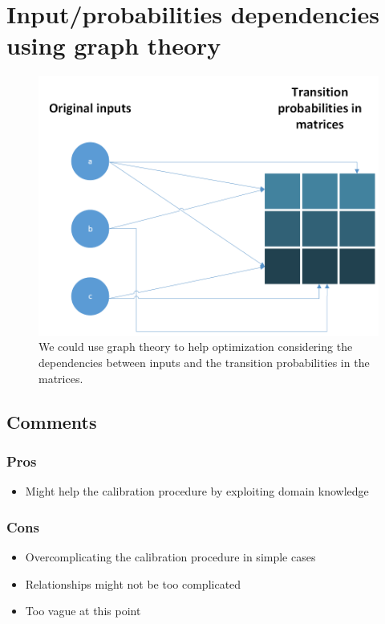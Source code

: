 \section{Input/probabilities dependencies using graph theory}

\begin{figure}[h!]
	\centering
	\includegraphics[width=\textwidth]{figures/graph_input_probs}
	\decoRule
	\caption[Dependency graph between inputs and transition probabilities]{We could use graph theory to help optimization considering the dependencies between inputs and the transition probabilities in the matrices.}
	\label{fig:graph_input_probs}
\end{figure}

\subsection{Comments}

\subsubsection*{Pros}
\begin{itemize}
	\item Might help the calibration procedure by exploiting domain knowledge
\end{itemize}

\subsubsection*{Cons}
\begin{itemize}
	\item Overcomplicating the calibration procedure in simple cases
	\item Relationships might not be too complicated
	\item Too vague at this point
\end{itemize}